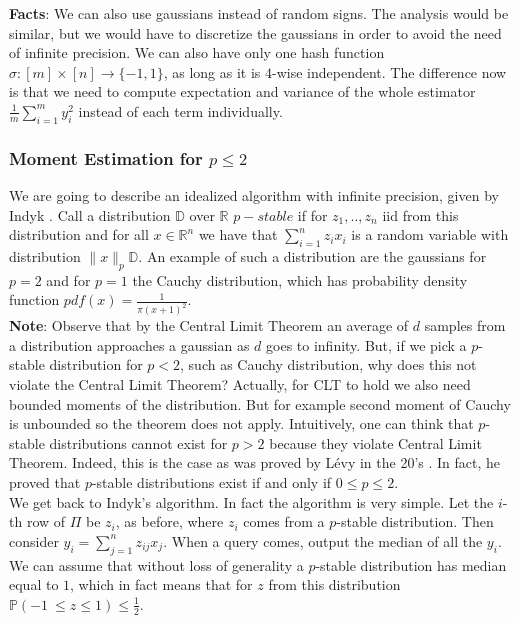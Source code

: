 \documentclass[11pt]{article}
\begin{document}
\textbf{Facts}: We can also use gaussians instead of random signs. The analysis would be similar, but we would have to discretize the gaussians in order to avoid the need of infinite precision. We can also have only one hash function $\sigma: [m] \times [n] \rightarrow \{ -1,1 \}$, as long as it is $4$-wise independent. The difference now is that we need to compute expectation and variance of the whole estimator $\frac{1}{m} \sum_{i=1}^m y_i^2$ instead of each term individually.

\subsubsection{Moment Estimation for $p \leq 2$}

We are going to describe an idealized algorithm with infinite precision, given by Indyk \cite{Indyk06}. Call a distribution $\mathbb{D}$ over $\mathbb{R}$ $p-stable$ if for  $z_1,..,z_n$ iid from this distribution and for all $x  \in \mathbb{R}^n$ we have that $\sum_{i=1}^nz_ix_i$ is a random variable with distribution $\|x\|_p \mathbb{ D}$. An example of such a distribution are the gaussians for $p=2$ and for $p=1$ the Cauchy distribution, which has probability density function $pdf(x) = \frac{1}{\pi (x+1)^2}$.\\

\textbf{Note}: Observe that by the Central Limit Theorem an average of $d$ samples from a distribution approaches a gaussian as $d$ goes to infinity. But, if we pick a $p$-stable distribution for $p<2$, such as Cauchy distribution, why does this not violate the Central Limit Theorem? Actually, for CLT to hold we also need bounded moments of the distribution. But for example second moment of Cauchy is unbounded so the theorem does not apply. Intuitively, one can think  that $p$-stable distributions cannot exist for $p>2$ because they violate Central Limit Theorem. Indeed, this is the case as was proved by L\'{e}vy in the 20's \cite{Levy25}. In fact, he proved that $p$-stable distributions exist if and only if $0 \leq p \leq 2$.\\


We get back to Indyk's algorithm. In fact the algorithm is very simple. Let the $i$-th row of $\Pi$ be $z_i$, as before, where $z_i$ comes from a $p$-stable distribution. Then consider $y_i = \sum_{j=1}^n z_{ij} x_j$. When a query comes, output the median of all the $y_i$. We can assume that without loss of generality a $p$-stable distribution has median equal to $1$, which in fact means that for $z$ from this distribution $\mathbb{P}(-1\ \leq z \leq 1) \leq \frac{1}{2}$.
\end{document}
